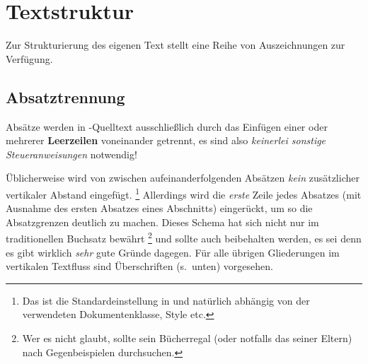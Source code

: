 \section{Textstruktur}

Zur Strukturierung des eigenen Text stellt \latex eine Reihe von Auszeichnungen zur Verfügung.

\subsection{Absatztrennung}

Absätze werden in {\latex}-Quelltext ausschließlich durch das
Einfügen einer oder mehrerer \textbf{Leerzeilen} voneinander
getrennt, es sind also \emph{keinerlei sonstige Steueranweisungen}
notwendig!
%
\begin{center}
\setlength{\fboxrule}{0.2mm}
\setlength{\fboxsep}{2mm}
\end{center}

Üblicherweise wird von {\latex} zwischen aufeinanderfolgenden 
Ab\-sätzen \emph{kein} zusätzlicher vertikaler Abstand eingefügt.%
\footnote{Das ist die Standardeinstellung in {\latex} und
natürlich abhängig von der verwendeten Dokumentenklasse, Style
etc.} 
Allerdings wird die
\emph{erste} Zeile jedes Absatzes (mit Ausnahme des ersten Absatzes
eines Abschnitts) eingerückt, um so die Absatzgrenzen deutlich zu
machen. Dieses Schema hat sich nicht nur im traditionellen
Buchsatz bewährt%
\footnote{Wer es nicht glaubt, sollte sein Bücherregal (oder notfalls das seiner Eltern) nach Gegenbeispielen durchsuchen.}
und sollte auch beibehalten werden, es sei denn
es gibt wirklich \emph{sehr} gute Gründe dagegen.
Für alle übrigen Gliederungen im vertikalen Textfluss sind Überschriften (s.\ unten) vorgesehen.





